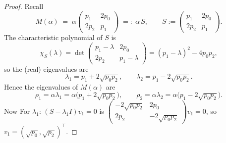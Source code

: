 \documentclass[11pt,reqno]{amsart}
\numberwithin{equation}{section}
\begin{document}
\begin{proof}
	Recall
	\[
	M(\alpha)\;=\;\alpha
	\begin{pmatrix}
		p_1 & 2p_0\\
		2p_2 & p_1
	\end{pmatrix}
	\;=:\;\alpha\,S,\qquad
	S:=
	\begin{pmatrix}
		p_1 & 2p_0\\
		2p_2 & p_1
	\end{pmatrix}.
	\]
	The characteristic polynomial of $S$ is
	\[
	\chi_{S}(\lambda)
	=\det\!\begin{pmatrix}p_1-\lambda&2p_0\\2p_2&p_1-\lambda\end{pmatrix}
	=(p_1-\lambda)^2-4p_0p_2,
	\]
	so the (real) eigenvalues are
	\[
	\lambda_1=p_1+2\sqrt{p_0p_2},\qquad
	\lambda_2=p_1-2\sqrt{p_0p_2}.
	\]
	Hence the eigenvalues of $M(\alpha)$ are
	\[
	\rho_1=\alpha\lambda_1=\alpha\bigl(p_1+2\sqrt{p_0p_2}\bigr),\qquad
	\rho_2=\alpha\lambda_2=\alpha\bigl(p_1-2\sqrt{p_0p_2}\bigr).
	\]
	Now For $\lambda_1$:
	\(
	(S-\lambda_1 I)v_1=0
	\)
	is
	\(
	\begin{pmatrix}-2\sqrt{p_0p_2}&2p_0\\2p_2&-2\sqrt{p_0p_2}\end{pmatrix}v_1=0
	\),
	so $v_1=(\sqrt{p_0},\sqrt{p_2})^\top$.
	

\end{proof}
\end{document}
